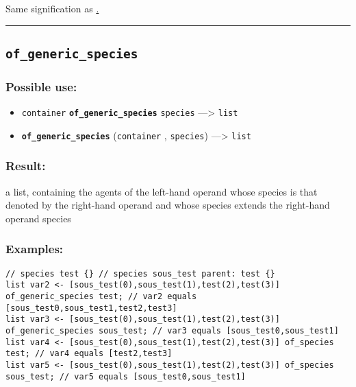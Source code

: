 \documentclass[]{book}
\providecommand{\tightlist}{%
  \setlength{\itemsep}{0pt}\setlength{\parskip}{0pt}}
\theoremstyle{definition}
\theoremstyle{definition}
\theoremstyle{definition}
\theoremstyle{remark}
\begin{document}
Same signification as \href{operators-a-to-a.html\#.}{.}

\begin{center}\rule{0.5\linewidth}{\linethickness}\end{center}

\subsection{\texorpdfstring{\texttt{of\_generic\_species}}{of\_generic\_species}}\label{of_generic_species}

\subsubsection{Possible use:}\label{possible-use-381}

\begin{itemize}
\tightlist
\item
  \texttt{container} \textbf{\texttt{of\_generic\_species}}
  \texttt{species} ---\textgreater{} \texttt{list}
\item
  \textbf{\texttt{of\_generic\_species}} (\texttt{container} ,
  \texttt{species}) ---\textgreater{} \texttt{list}
\end{itemize}

\subsubsection{Result:}\label{result-367}

a list, containing the agents of the left-hand operand whose species is
that denoted by the right-hand operand and whose species extends the
right-hand operand species

\subsubsection{Examples:}\label{examples-261}

\begin{verbatim}
// species test {} // species sous_test parent: test {}  
list var2 <- [sous_test(0),sous_test(1),test(2),test(3)] of_generic_species test; // var2 equals [sous_test0,sous_test1,test2,test3] 
list var3 <- [sous_test(0),sous_test(1),test(2),test(3)] of_generic_species sous_test; // var3 equals [sous_test0,sous_test1] 
list var4 <- [sous_test(0),sous_test(1),test(2),test(3)] of_species test; // var4 equals [test2,test3] 
list var5 <- [sous_test(0),sous_test(1),test(2),test(3)] of_species sous_test; // var5 equals [sous_test0,sous_test1]
\end{verbatim}
\end{document}
